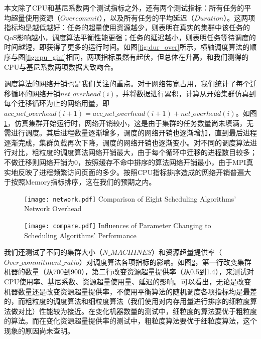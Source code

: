 本文除了CPU和基尼系数两个测试指标之外，还有两个测试指标：所有任务的平均超量使用资源（$Overcommit$），以及所有任务的平均延迟（$Duration$）。这两项指标均是越低越好：任务的超量使用资源越少，则表明在真实的集群中该任务的QoS影响越小，调度算法平衡性能更强；任务的延迟越小，则表明任务等待调度的时间越短，即获得了更多的运行时间。如图\ref{fig:dur_over}所示，横轴调度算法的顺序与图\ref{fig:cpu_gini}相同，两项指标虽然有起伏，但总体在升高，和我们测得的CPU与基尼系数两项数据大致吻合。

调度算法的网络开销也是我们关注的重点。对于网络带宽占用，我们统计了每个迁移循环的网络开销$net\_overhead(i)$，并将数据进行累积，计算从开始集群仿真到每个迁移循环为止的网络用量，即$acc\_net\_overhead(i+1)=acc\_net\_overhead(i+1)+net\_overhead(i)$。如图\ref{fig:minetwork}，仿真集群开始运行时，网络开销较小，这是由于集群的任务数量尚未填满，无需进行调度。其后进程数量逐渐增多，调度的网络开销也逐渐增加，直到最后进程逐渐完成，集群负载再次下降，调度的网络开销也逐渐变小。对不同的调度算法进行对比，粗粒度的调度算法网络开销最大，由于每个循环中迁移的进程数目较多；不做迁移则网络开销为0，按照缓存不命中排序的算法网络开销最小，由于MPI真实地反映了进程频繁访问页面的多少。按照CPU指标排序造成的网络开销普遍大于按照Memory指标排序，这在我们的预期之内。
\begin{figure}[!htp]
  \centering
  \texttt{[image: network.pdf]}
    {Comparison of Eight Scheduling Algorithms' Network Overhead}
  \label{fig:minetwork}
\end{figure}

\begin{figure}[!htp]
  \centering
  \texttt{[image: compare.pdf]}
    {Influences of Parameter Changing to Scheduling Algorithms' Performance}
  \label{fig:comparing}
\end{figure}

我们还测试了不同的集群大小（$N\_MACHINES$）和资源超量提供率（$Over\_commitment\_ratio$）对调度算法各项指标的影响。如图\ref{fig:comparing}，第一行改变集群机器的数量（从700到900），第二行改变资源超量提供率（从0.5到1.4），来测试对CPU使用率、基尼系数、资源超量使用量、延迟的影响。可以看出，无论是改变机器数量还是改变资源超量提供率，不使用平衡算法的随机调度各项指标均是最差的，而粗粒度的调度算法和细粒度算法（我们使用对内存用量进行排序的细粒度算法做对比）性能较为接近。在变化机器数量的测试中，细粒度的算法要优于粗粒度的算法。而在变化资源超量提供率的测试中，粗粒度算法要优于细粒度算法，这个现象的原因尚未查明。

